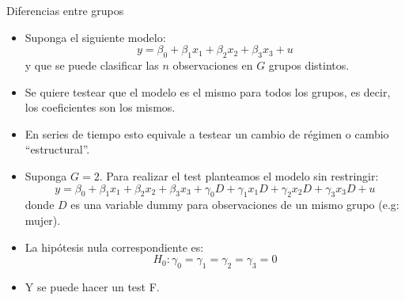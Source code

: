 \documentclass{beamer}
\begin{document}
\begin{frame}[shrink=10]{ Diferencias entre grupos}
\begin{itemize}
    \item Suponga el siguiente modelo:
    \[
    y = \beta_0 + \beta_1 x_1 + \beta_2 x_2 + \beta_3 x_3 + u
    \]
    y que se puede clasificar las \(n\) observaciones en \(G\) grupos distintos.
\end{itemize}

\begin{itemize}
    \item Se quiere testear que el modelo es el mismo para todos los grupos, es decir, los coeficientes son los mismos.
    \item En series de tiempo esto equivale a testear un cambio de régimen o cambio “estructural”.
\end{itemize}

\begin{itemize}
    \item Suponga \(G = 2\). Para realizar el test planteamos el modelo sin restringir:
    \[
    y = \beta_0 + \beta_1 x_1 + \beta_2 x_2 + \beta_3 x_3 + \gamma_0 D + \gamma_1 x_1 D + \gamma_2 x_2 D + \gamma_3 x_3 D + u
    \]
    donde \(D\) es una variable dummy para observaciones de un mismo grupo (e.g: mujer).
\end{itemize}

\begin{itemize}
    \item La hipótesis nula correspondiente es:
    \[
    H_0 : \gamma_0 = \gamma_1 = \gamma_2 = \gamma_3 = 0
    \]
    \item Y se puede hacer un test F.
\end{itemize}
\end{frame}
\end{document}
